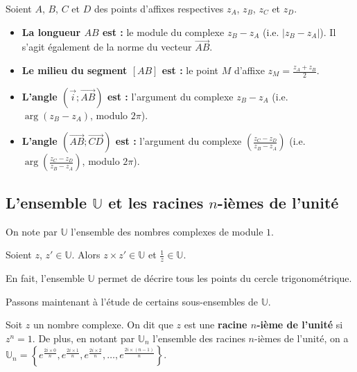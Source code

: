 	\begin{formula}[Propriétés]
		Soient $A$, $B$, $C$ et $D$ des points d'affixes respectives $z_A$, $z_B$, $z_C$ et $z_D$.
		\begin{itemize}
			\item \textbf{La longueur $AB$ est :} le module du complexe $z_B - z_A$ (i.e. $|z_B - z_A|$). Il s'agit également de la norme du vecteur $\overrightarrow{AB}$.
			\item \textbf{Le milieu du segment $[AB]$ est :} le point $M$ d'affixe $\displaystyle{z_{M} = \frac{z_A + z_B}{2}}$.
			\item \textbf{L'angle $(\overrightarrow{i}; \overrightarrow{AB})$ est :} l'argument du complexe $z_B - z_A$ (i.e. $\operatorname{arg}(z_B - z_A)$, modulo $2\pi$).
			\item \textbf{L'angle $(\overrightarrow{AB}; \overrightarrow{CD})$ est :} l'argument du complexe $\displaystyle{\left(\frac{z_C - z_D}{z_B - z_A}\right)}$ (i.e. $\displaystyle{\operatorname{arg}\left(\frac{z_C - z_D}{z_B - z_A}\right)}$, modulo $2\pi$).
		\end{itemize}
	\end{formula}
	
	\subsection{L'ensemble \texorpdfstring{$\mathbb{U}$}{U} et les racines \texorpdfstring{$n$}{n}-ièmes de l'unité}
	
	\begin{formula}
		On note par $\mathbb{U}$ l'ensemble des nombres complexes de module $1$.
	\end{formula}
	
	\begin{formula}
		Soient $z$, $z' \in \mathbb{U}$. Alors $z \times z' \in \mathbb{U}$ et $\frac{1}{z} \in \mathbb{U}$.
	\end{formula}
	
	En fait, l'ensemble $\mathbb{U}$ permet de décrire tous les points du cercle trigonométrique.
	
	Passons maintenant à l'étude de certains sous-ensembles de $\mathbb{U}$.
	
	\begin{formula}
		Soit $z$ un nombre complexe. On dit que $z$ est une \textbf{racine $n$-ième de l'unité} si $z^n = 1$.
		\newpar
		De plus, en notant par $\mathbb{U}_n$ l'ensemble des racines $n$-ièmes de l'unité, on a
		\newline
		$\displaystyle{\mathbb{U}_n = \left\{ e^{\frac{2i \times 0}{n}}, e^{\frac{2i \times 1}{n}}, e^{\frac{2i \times 2}{n}}, \dots, e^{\frac{2i \times (n-1)}{n}} \right\}}$.
	\end{formula}
	
